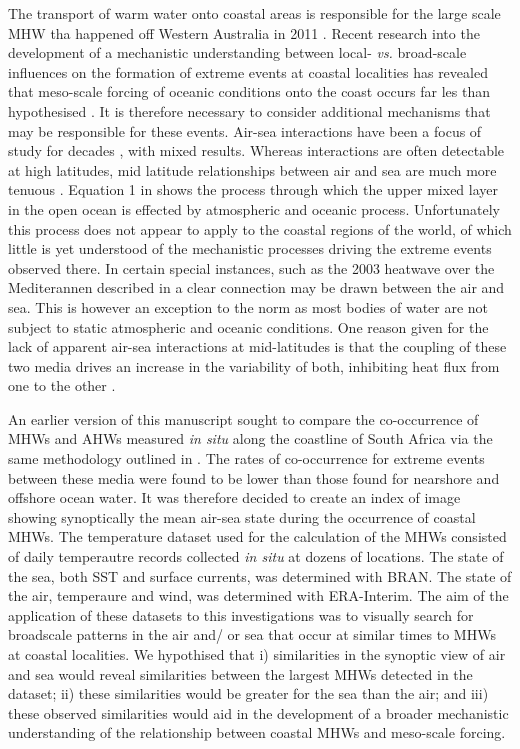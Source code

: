 \documentclass[a4paper,10pt,review]{elsarticle}
\begin{document}
The transport of warm water onto coastal areas is responsible for the large scale MHW tha happened off Western Australia in 2011 \citep{Feng2013, Benthuysen2014}. Recent research into the development of a mechanistic understanding between local- \emph{vs.} broad-scale influences on the formation of extreme events at coastal localities has revealed that meso-scale forcing of oceanic conditions onto the coast occurs far les than hypothesised \citep{Schlegel2016}. It is therefore necessary to consider additional mechanisms that may be responsible for these events. Air-sea interactions have been a focus of study for decades \citep{Frankignoul1985}, with mixed results. Whereas interactions are often detectable at high latitudes, mid latitude relationships between air and sea are much more tenuous \citep{Krishnamurti1988}. Equation 1 in \citet{Deser2010} shows the process through which the upper mixed layer in the open ocean is effected by atmospheric and oceanic process. Unfortunately this process does not appear to apply to the coastal regions of the world, of which little is yet understood of the mechanistic processes driving the extreme events observed there. In certain special instances, such as the 2003 heatwave over the Mediterannen described in \citet{Garrabou2009} a clear connection may be drawn between the air and sea. This is however an exception to the norm as most bodies of water are not subject to static atmospheric and oceanic conditions. One reason given for the lack of apparent air-sea interactions at mid-latitudes is that the coupling of these two media drives an increase in the variability of both, inhibiting heat flux from one to the other \citep{Barsugli1998}.

An earlier version of this manuscript sought to compare the co-occurrence of MHWs and AHWs measured \emph{in situ} along the coastline of South Africa via the same methodology outlined in \citet{Schlegel2016}. The rates of co-occurrence for extreme events between these media were found to be lower than those found for nearshore and offshore ocean water. It was therefore decided to create an index of image showing synoptically the mean air-sea state during the occurrence of coastal MHWs. The temperature dataset used for the calculation of the MHWs consisted of daily temperautre records collected \emph{in situ} at dozens of locations. The state of the sea, both SST and surface currents, was determined with BRAN. The state of the air, temperaure and wind, was determined with ERA-Interim. The aim of the application of these datasets to this investigations was to visually search for broadscale patterns in the air and/ or sea that occur at similar times to MHWs at coastal localities. We hypothised that i) similarities in the synoptic view of air and sea would reveal similarities between the largest MHWs detected in the dataset; ii) these similarities would be greater for the sea than the air; and iii) these observed similarities would aid in the development of a broader mechanistic understanding of the relationship between coastal MHWs and meso-scale forcing.
\end{document}
